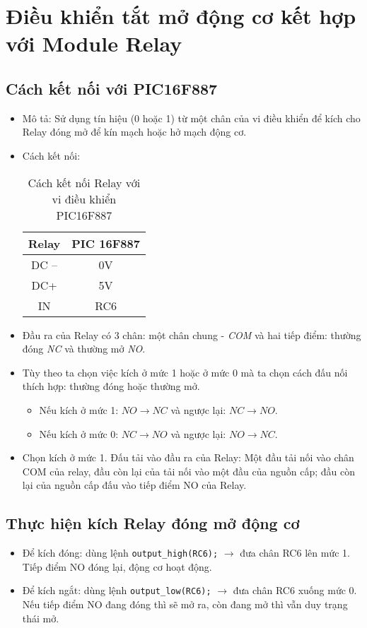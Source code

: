 \section{Điều khiển tắt mở động cơ kết hợp với Module Relay}
\subsection{Cách kết nối với PIC16F887}
\begin{itemize}
\item Mô tả: Sử dụng tín hiệu (0 hoặc 1) từ một chân của vi điều khiển để kích cho Relay đóng mở để kín mạch hoặc hở mạch động cơ.
\item Cách kết nối:
\begin{table}[h]
\begin{center}
\begin{tabular}{|c|c|}\hline
\textbf{Relay} & \textbf{PIC 16F887} \\ \hline
DC -- & 0V \\ \hline
DC+ & 5V \\ \hline
IN & RC6 \\ \hline
\end{tabular}
\end{center}
\caption{Cách kết nối Relay với vi điều khiển PIC16F887}
\end{table}
\item Đầu ra của Relay có 3 chân: một chân chung - \textit{COM} và hai tiếp điểm: thường đóng \textit{NC} và thường mở \textit{NO}.
\item Tùy theo ta chọn việc kích ở mức 1 hoặc ở mức 0 mà ta chọn cách đấu nối thích hợp: thường đóng hoặc thường mở.
\begin{itemize}
\item Nếu kích ở mức 1: $NO \longrightarrow NC$ và ngược lại: $NC \longrightarrow NO$.
\item Nếu kích ở mức 0: $NC \longrightarrow NO$ và ngược lại: $NO \longrightarrow NC$.
\end{itemize}
\item Chọn kích ở mức 1. Đấu tải vào đầu ra của Relay: Một đầu tải nối vào chân COM của relay, đầu còn lại của tải nối vào một đầu của nguồn cấp; đầu còn lại của nguồn cấp đấu vào tiếp điểm NO của Relay.
\end{itemize}
\subsection{Thực hiện kích Relay đóng mở động cơ}
\begin{itemize}
\item Để kích đóng: dùng lệnh \verb|output_high(RC6);| $\longrightarrow$ đưa chân RC6 lên mức 1. Tiếp điểm NO đóng lại, động cơ hoạt động.
\item Để kích ngắt: dùng lệnh \verb|output_low(RC6);| $\longrightarrow$ đưa chân RC6 xuống mức 0. Nếu tiếp điểm NO đang đóng thì sẽ mở ra, còn đang mở thì vẫn duy trạng thái mở.
\end{itemize}